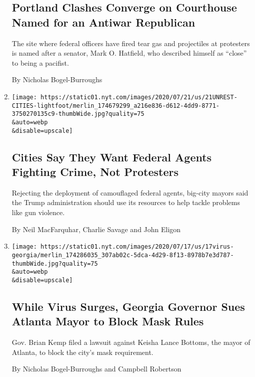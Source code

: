 \begin{enumerate}
{  \subsection{Portland Clashes Converge on Courthouse Named for an
  Antiwar
  Republican}\label{portland-clashes-converge-on-courthouse-named-for-an-antiwar-republican}}

  The site where federal officers have fired tear gas and projectiles at
  protesters is named after a senator, Mark O. Hatfield, who described
  himself as ``close'' to being a pacifist.

  By Nicholas Bogel-Burroughs
\item
  \href{/2020/07/21/us/trump-federal-agents-chicago.html}{}

  \texttt{[image: https://static01.nyt.com/images/2020/07/21/us/21UNREST-CITIES-lightfoot/merlin\_174679299\_a216e836-d612-4dd9-8771-3750270135c9-thumbWide.jpg?quality=75\\\&auto=webp\\\&disable=upscale]}

  \hypertarget{cities-say-they-want-federal-agents-fighting-crime-not-protesters}{%
  \subsection{Cities Say They Want Federal Agents Fighting Crime, Not
  Protesters}\label{cities-say-they-want-federal-agents-fighting-crime-not-protesters}}

  Rejecting the deployment of camouflaged federal agents, big-city
  mayors said the Trump administration should use its resources to help
  tackle problems like gun violence.

  By Neil MacFarquhar, Charlie Savage and John Eligon
\item
  \href{/2020/07/17/us/brian-kemp-georgia-keisha-lance-bottoms-atlanta.html}{}

  \texttt{[image: https://static01.nyt.com/images/2020/07/17/us/17virus-georgia/merlin\_174286035\_307ab02c-5dca-4d29-8f13-8978b7e3d787-thumbWide.jpg?quality=75\\\&auto=webp\\\&disable=upscale]}

  \hypertarget{while-virus-surges-georgia-governor-sues-atlanta-mayor-to-block-mask-rules}{%
  \subsection{While Virus Surges, Georgia Governor Sues Atlanta Mayor to
  Block Mask
  Rules}\label{while-virus-surges-georgia-governor-sues-atlanta-mayor-to-block-mask-rules}}

  Gov. Brian Kemp filed a lawsuit against Keisha Lance Bottoms, the
  mayor of Atlanta, to block the city's mask requirement.

  By Nicholas Bogel-Burroughs and Campbell Robertson
\end{enumerate}

